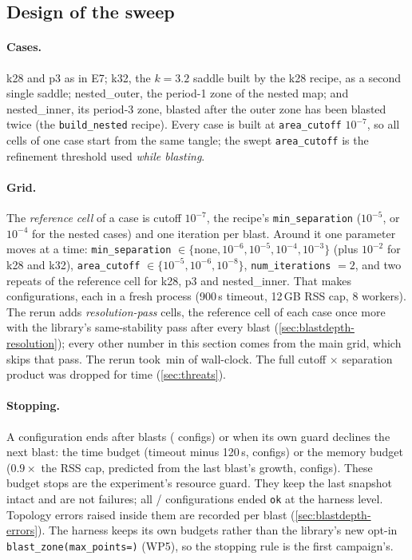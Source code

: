 \documentclass[11pt,a4paper]{article}
\newcommand{\code}[1]{\texttt{#1}}
\begin{document}
\subsection{Design of the sweep}
\label{sec:blastdepth-design}

\paragraph{Cases.} k28 and p3 as in E7; k32, the $k=3.2$ saddle built by the
k28 recipe, as a second single saddle; nested\_outer, the period-1 zone of
the nested map; and nested\_inner, its period-3 zone, blasted after the outer
zone has been blasted twice (the \code{build\_nested} recipe). Every case is
built at \code{area\_cutoff} $10^{-7}$, so all cells of one case start from
the same tangle; the swept \code{area\_cutoff} is the refinement threshold
used \emph{while blasting}.

\paragraph{Grid.} The \emph{reference cell} of a case is cutoff $10^{-7}$, the
recipe's \code{min\_separation} ($10^{-5}$, or $10^{-4}$ for the nested cases)
and one iteration per blast. Around it one parameter moves at a time:
\code{min\_separation} $\in\{\text{none},10^{-6},10^{-5},10^{-4},10^{-3}\}$
(plus $10^{-2}$ for k28 and k32), \code{area\_cutoff}
$\in\{10^{-5},10^{-6},10^{-8}\}$, \code{num\_iterations} $=2$, and two repeats
of the reference cell for k28, p3 and nested\_inner. That makes
\NumDeepConfigs{} configurations, each in a fresh process (900\,s timeout,
12\,GB RSS cap, 8 workers). The rerun adds \NumDeepPassCells{}
\emph{resolution-pass} cells, the reference cell of each case once more with
the library's same-stability pass after every blast
(\cref{sec:blastdepth-resolution}); every other number in this section comes
from the main grid, which skips that pass. The rerun took
\NumDeepWallMin\,min of wall-clock. The full cutoff $\times$ separation
product was dropped for time (\cref{sec:threats}).

\paragraph{Stopping.} A configuration ends after \NumDeepMaxBlasts{} blasts
(\NumDeepStopMaxBlasts{} configs) or when its own guard declines the next
blast: the time budget (timeout minus 120\,s, \NumDeepStopBudget{} configs)
or the memory budget ($0.9\times$ the RSS cap, predicted from the last
blast's growth, \NumDeepStopMemoryBudget{} configs). These budget stops are
the experiment's resource guard. They keep the last snapshot intact and are
not failures; all \NumDeepConfigsOk/\NumDeepConfigs{} configurations ended
\code{ok} at the harness level. Topology errors raised inside them are
recorded per blast (\cref{sec:blastdepth-errors}). The harness keeps its own
budgets rather than the library's new opt-in \code{blast\_zone(max\_points=)}
(WP5), so the stopping rule is the first campaign's.
\end{document}
